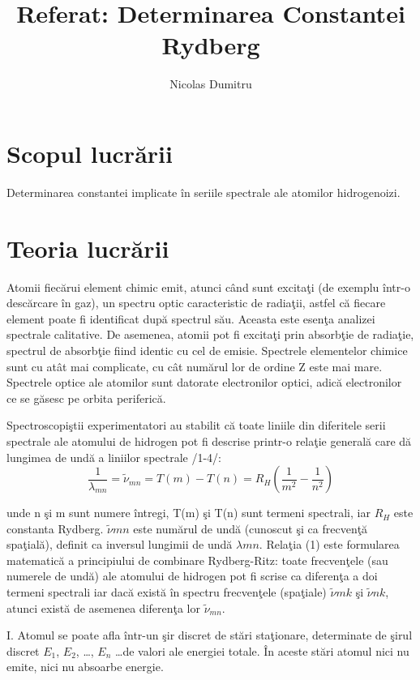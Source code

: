 \documentclass{article}
\title{Referat: Determinarea Constantei Rydberg}
\author{Nicolas Dumitru}
\begin{document}
\maketitle

\section{Scopul lucrării}
Determinarea constantei implicate în seriile spectrale ale atomilor hidrogenoizi.

\section{Teoria lucrării}
Atomii fiecărui element chimic emit, atunci când sunt excitaţi (de exemplu într-o
descărcare în gaz), un spectru optic caracteristic de radiaţii, astfel că fiecare element poate fi
identificat după spectrul său. Aceasta este esenţa analizei spectrale calitative. De asemenea,
atomii pot fi excitaţi prin absorbţie de radiaţie, spectrul de absorbţie fiind identic cu cel de
emisie. Spectrele elementelor chimice sunt cu atât mai complicate, cu cât numărul lor de ordine
Z este mai mare. Spectrele optice ale atomilor sunt datorate electronilor optici, adică
electronilor ce se găsesc pe orbita periferică.

Spectroscopiştii experimentatori au stabilit că toate liniile din diferitele serii spectrale
ale atomului de hidrogen pot fi descrise printr-o relaţie generală care dă lungimea de undă a
liniilor spectrale /1-4/:
\begin{equation}
	\frac{1}{\lambda_{mn}} = \tilde{\nu}_{mn} = T(m) - T(n) = R_H \left( \frac{1}{m^2} - \frac{1}{n^2} \right)
\end{equation}

unde n şi m sunt numere întregi, T(m) şi T(n) sunt termeni spectrali, iar $R_H$ este constanta
Rydberg. $\tilde{\nu}{mn}$ este numărul de undă (cunoscut şi ca frecvenţă spaţială), definit ca inversul
lungimii de undă $\lambda{mn}$. Relaţia (1) este formularea matematică a principiului de combinare
Rydberg-Ritz: toate frecvenţele (sau numerele de undă) ale atomului de hidrogen pot fi scrise
ca diferenţa a doi termeni spectrali iar dacă există în spectru frecvenţele (spaţiale) $\tilde{\nu}{mk}$
şi $\tilde{\nu}{nk}$, atunci există de asemenea diferenţa lor $\tilde{\nu}_{mn}$.

I. Atomul se poate afla într-un şir discret de stări staţionare, determinate de şirul discret
$E_1$, $E_2$, \ldots, $E_n$ \ldots de valori ale energiei totale. În aceste stări atomul nici nu emite, nici nu
absoarbe energie.
\end{document}
